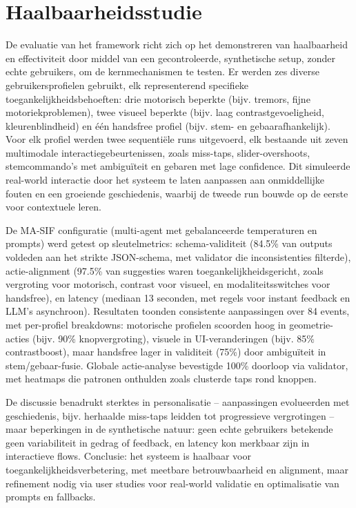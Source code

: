 \documentclass[openany]{book}
\begin{document}
\section*{Haalbaarheidsstudie}
De evaluatie van het framework richt zich op het demonstreren van haalbaarheid en effectiviteit door middel van een gecontroleerde, synthetische setup, zonder echte gebruikers, om de kernmechanismen te testen. Er werden zes diverse gebruikersprofielen gebruikt, elk representerend specifieke toegankelijkheidsbehoeften: drie motorisch beperkte (bijv. tremors, fijne motoriekproblemen), twee visueel beperkte (bijv. laag contrastgevoeligheid, kleurenblindheid) en één handsfree profiel (bijv. stem- en gebaarafhankelijk). Voor elk profiel werden twee sequentiële runs uitgevoerd, elk bestaande uit zeven multimodale interactiegebeurtenissen, zoals miss-taps, slider-overshoots, stemcommando's met ambiguïteit en gebaren met lage confidence. Dit simuleerde real-world interactie door het systeem te laten aanpassen aan onmiddellijke fouten en een groeiende geschiedenis, waarbij de tweede run bouwde op de eerste voor contextuele leren.

De MA-SIF configuratie (multi-agent met gebalanceerde temperaturen en prompts) werd getest op sleutelmetrics: schema-validiteit (84.5\% van outputs voldeden aan het strikte JSON-schema, met validator die inconsistenties filterde), actie-alignment (97.5\% van suggesties waren toegankelijkheidsgericht, zoals vergroting voor motorisch, contrast voor visueel, en modaliteitsswitches voor handsfree), en latency (mediaan 13 seconden, met regels voor instant feedback en LLM's asynchroon). Resultaten toonden consistente aanpassingen over 84 events, met per-profiel breakdowns: motorische profielen scoorden hoog in geometrie-acties (bijv. 90\% knopvergroting), visuele in UI-veranderingen (bijv. 85\% contrastboost), maar handsfree lager in validiteit (75\%) door ambiguïteit in stem/gebaar-fusie. Globale actie-analyse bevestigde 100\% doorloop via validator, met heatmaps die patronen onthulden zoals clusterde taps rond knoppen.

De discussie benadrukt sterktes in personalisatie – aanpassingen evolueerden met geschiedenis, bijv. herhaalde miss-taps leidden tot progressieve vergrotingen – maar beperkingen in de synthetische natuur: geen echte gebruikers betekende geen variabiliteit in gedrag of feedback, en latency kon merkbaar zijn in interactieve flows. Conclusie: het systeem is haalbaar voor toegankelijkheidsverbetering, met meetbare betrouwbaarheid en alignment, maar refinement nodig via user studies voor real-world validatie en optimalisatie van prompts en fallbacks.
\end{document}
